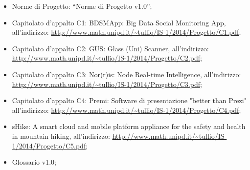 \begin{itemize}
	\item Norme di Progetto: “Norme di Progetto v1.0”;
    \item Capitolato d’appalto C1: BDSMApp: Big Data Social Monitoring App, all’indirizzo: \url{http://www.math.unipd.it/~tullio/IS-1/2014/Progetto/C1.pdf};
    \item Capitolato d’appalto C2: GUS: Glass (Uni) Scanner, all’indirizzo: \url{http://www.math.unipd.it/~tullio/IS-1/2014/Progetto/C2.pdf};
    \item Capitolato d’appalto C3: Nor(r)is: Node Real-time Intelligence, all’indirizzo: \url{http://www.math.unipd.it/~tullio/IS-1/2014/Progetto/C3.pdf};
    \item Capitolato d’appalto C4: Premi: Software di presentazione "better than Prezi" all’indirizzo: \url{http://www.math.unipd.it/~tullio/IS-1/2014/Progetto/C4.pdf};
    \item sHike: A smart cloud and mobile platform appliance for the safety and health in mountain hiking, all’indirizzo: \url{http://www.math.unipd.it/~tullio/IS-1/2014/Progetto/C5.pdf};
    \item Glossario v1.0;
\end{itemize}
